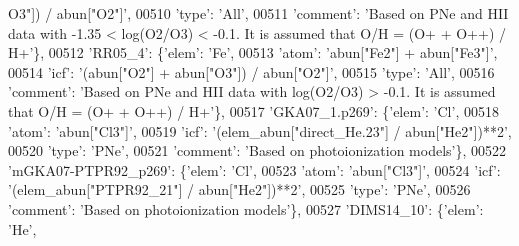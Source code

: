 \begin{DoxyCode}
{      O3"]) / abun["O2"]'},
00510                                       \textcolor{stringliteral}{'type'}: \textcolor{stringliteral}{'All'},
00511                                       \textcolor{stringliteral}{'comment'}: \textcolor{stringliteral}{'Based on PNe and HII data with -1.35 < log(O2/O3) < -0.1.
       It is assumed that O/H = (O+ + O++) / H+'}\},
00512                          \textcolor{stringliteral}{'RR05\_4'}: \{\textcolor{stringliteral}{'elem'}: \textcolor{stringliteral}{'Fe'},
00513                                       \textcolor{stringliteral}{'atom'}: \textcolor{stringliteral}{'abun["Fe2"] + abun["Fe3"]'},
00514                                       \textcolor{stringliteral}{'icf'}: \textcolor{stringliteral}{'(abun["O2"] + abun["O3"]) / abun["O2"]'},
00515                                       \textcolor{stringliteral}{'type'}: \textcolor{stringliteral}{'All'},
00516                                       \textcolor{stringliteral}{'comment'}: \textcolor{stringliteral}{'Based on PNe and HII data with log(O2/O3) > -0.1. It is
       assumed that O/H = (O+ + O++) / H+'}\},
00517                          \textcolor{stringliteral}{'GKA07\_1.p269'}: \{\textcolor{stringliteral}{'elem'}: \textcolor{stringliteral}{'Cl'},
00518                                       \textcolor{stringliteral}{'atom'}: \textcolor{stringliteral}{'abun["Cl3"]'},
00519                                       \textcolor{stringliteral}{'icf'}: \textcolor{stringliteral}{'(elem\_abun["direct\_He.23"] / abun["He2"])**2'},
00520                                       \textcolor{stringliteral}{'type'}: \textcolor{stringliteral}{'PNe'},
00521                                       \textcolor{stringliteral}{'comment'}: \textcolor{stringliteral}{'Based on photoionization models'}\},
00522                          \textcolor{stringliteral}{'mGKA07-PTPR92\_p269'}: \{\textcolor{stringliteral}{'elem'}: \textcolor{stringliteral}{'Cl'},
00523                                       \textcolor{stringliteral}{'atom'}: \textcolor{stringliteral}{'abun["Cl3"]'},
00524                                       \textcolor{stringliteral}{'icf'}: \textcolor{stringliteral}{'(elem\_abun["PTPR92\_21"] / abun["He2"])**2'},
00525                                       \textcolor{stringliteral}{'type'}: \textcolor{stringliteral}{'PNe'},
00526                                       \textcolor{stringliteral}{'comment'}: \textcolor{stringliteral}{'Based on photoionization models'}\},
00527                          \textcolor{stringliteral}{'DIMS14\_10'}: \{\textcolor{stringliteral}{'elem'}: \textcolor{stringliteral}{'He'},

\end{DoxyCode}
